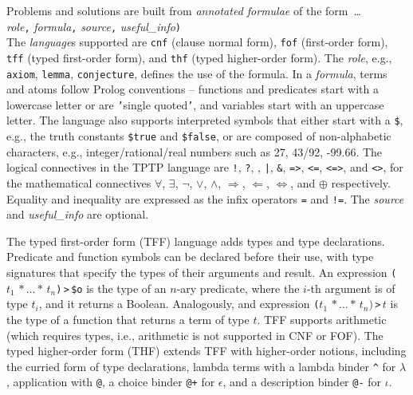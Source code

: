 \documentclass{ceurart}
\newcommand{\smalltt}[1]{\small \texttt{#1}}
\begin{document}
Problems and solutions are built from {\em annotated formulae} of the form~\ldots \\
{\em role}{\tt ,}
{\em formula}{\tt ,}
{\em source}{\tt ,}
{\em useful\_info}{\tt )}\\
The {\em language}s supported are {\smalltt{cnf}} (clause normal form), {\smalltt{fof}}
(first-order form), {\smalltt{tff}} (typed first-order form), and {\smalltt{thf}}
(typed higher-order form).
The {\em role}, e.g., {\smalltt{axiom}}, {\smalltt{lemma}}, {\smalltt{conjecture}}, defines the 
use of the formula.
In a {\em formula}, terms and atoms follow Prolog conventions -- functions and predicates start 
with a lowercase letter or are {\tt '}single quoted{\tt '}, and variables start with an uppercase 
letter.
The language also supports interpreted symbols that either start with a {\tt \$}, e.g., the 
truth constants {\smalltt{\$true}} and {\smalltt{\$false}}, or are composed of 
non-alphabetic characters, e.g., integer/rational/real numbers such as 27, 43/92, -99.66.
The logical connectives in the TPTP language are
{\tt !}, {\tt ?}, {\tt {\raisebox{0.4ex}{\texttildelow}}}, {\tt |}, {\tt \&}, {\tt =>}, {\tt <=},
{\tt <=>}, and {\tt <{\raisebox{0.4ex}{\texttildelow}}>},
for the mathematical connectives
$\forall$, $\exists$, $\neg$, $\vee$, $\wedge$, $\Rightarrow$, $\Leftarrow$, $\Leftrightarrow$, 
and $\oplus$ respectively.
Equality and inequality are expressed as the infix operators {\tt =} and {\tt !=}.
The {\em source} and {\em useful\_info} are optional.

The typed first-order form (TFF) language adds types and type declarations.
Predicate and function symbols can be declared before their use, with type signatures that 
specify the types of their arguments and result.
An expression {\tt ($t_1\,*\ldots*\,t_n$)$\,$>$\,$\$o} is the type of an $n$-ary predicate, where 
the $i$-th argument is of type $t_i$, and it returns a Boolean.
Analogously, and expression {\tt ($t_1\,*\ldots*\,t_n)\,$>$\,t$} is the type of a function
that returns a term of type $t$.
TFF supports arithmetic (which requires types, i.e., arithmetic is not supported in CNF or FOF).
The typed higher-order form (THF) extends TFF with higher-order notions, including the
curried form of type declarations, lambda terms with a lambda 
binder {\tt \verb|^|} for $\lambda$, application with {\tt @}, a choice binder {\tt @+} for 
$\epsilon$, and a description binder {\tt @-} for $\iota$.
\end{document}

